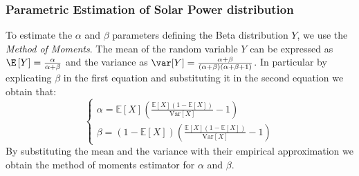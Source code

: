 \documentclass[english]{article}
\numberwithin{definition}{section}
\numberwithin{theorem}{section}
\numberwithin{problem}{section}
\begin{document}
\subsubsection{Parametric Estimation of Solar Power distribution}
\label{subsection: beta estim}
To estimate the \(\alpha\) and \(\beta\) parameters defining the Beta distribution \(Y\), we use the \emph{Method of Moments}. 
The mean of the random variable \(Y\) can be expressed as \(\E\left[ Y\right] = \frac{\alpha}{\alpha + \beta} \) and the variance as \(\var [Y]= \frac{\alpha + \beta}{(\alpha + \beta)(\alpha + \beta + 1)}\). In particular by explicating \(\beta\) in the first equation and substituting it in the second equation we obtain that:
\begin{equation}
\begin{cases}
\alpha = \mathbb{E}[X] \left( \frac{\mathbb{E}[X](1 - \mathbb{E}[X])}{\mathrm{Var}[X]} - 1 \right) \\
\beta = (1 - \mathbb{E}[X]) \left( \frac{\mathbb{E}[X](1 - \mathbb{E}[X])}{\mathrm{Var}[X]} - 1 \right)
\end{cases}
\end{equation}
By substituting the mean and the variance with their empirical approximation we obtain the method of moments estimator for \(\alpha\) and \(\beta\).
\end{document}

